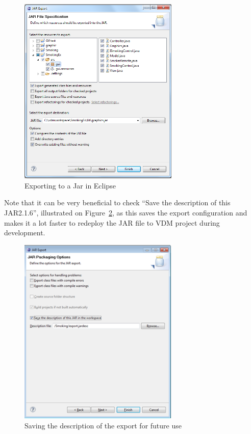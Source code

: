 \documentclass{overturerepchap}
\begin{document}
\begin{figure}[h]
\begin{center}
  \includegraphics[width=3in]{figures/SmokersJarExport}
  \caption[labelInTOC]{Exporting to a Jar in Eclipse}
  \label{fig:gui:JarExport}
\end{center}
\end{figure}

Note that it can be very beneficial to check ``Save the description of this JAR2.1.6'', illustrated on Figure~\ref{fig:gui:SaveExport}, as this saves the export configuration and makes it a lot faster to redeploy the JAR file to VDM project during development.

\begin{figure}[h]
\begin{center}
  \includegraphics[width=3in]{figures/SmokersSaveExport}
  \caption[labelInTOC]{Saving the description of the export for future use}
  \label{fig:gui:SaveExport}
\end{center}
\end{figure}
\end{document}
